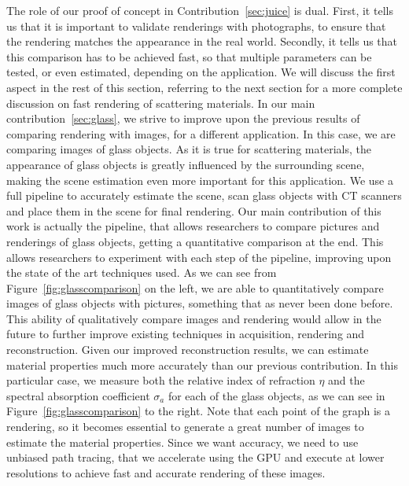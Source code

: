 The role of our proof of concept in Contribution~\ref{sec:juice} is dual. First, it tells us that it is important to validate renderings with photographs, to ensure that the rendering matches the appearance in the real world. Secondly, it tells us that this comparison has to be achieved fast, so that multiple parameters can be tested, or even estimated, depending on the application. We will discuss the first aspect in the rest of this section, referring to the next section for a more complete discussion on fast rendering of scattering materials. In our main contribution~\ref{sec:glass}, we strive to improve upon the previous results of comparing rendering with images, for a different application. In this case, we are comparing images of glass objects. As it is true for scattering materials, the appearance of glass objects is greatly influenced by the surrounding scene, making the scene estimation even more important for this application. We use a full pipeline to accurately estimate the scene, scan glass objects with CT scanners and place them in the scene for final rendering. Our main contribution of this work is actually the pipeline, that allows researchers to compare pictures and renderings of glass objects, getting a quantitative comparison at the end. This allows researchers to experiment with each step of the pipeline, improving upon the state of the art techniques used. As we can see from Figure~\ref{fig:glasscomparison} on the left, we are able to quantitatively compare images of glass objects with pictures, something that as never been done before. This ability of qualitatively compare images and rendering would allow in the future to further improve existing techniques in acquisition, rendering and reconstruction. Given our improved reconstruction results, we can estimate material properties much more accurately than our previous contribution. In this particular case, we measure both the relative index of refraction $\eta$ and the spectral absorption coefficient $\sigma_a$ for each of the glass objects, as we can see in Figure~\ref{fig:glasscomparison} to the right. Note that each point of the graph is a rendering, so it becomes essential to generate a great number of images to estimate the material properties. Since we want accuracy, we need to use unbiased path tracing, that we accelerate using the GPU and execute at lower resolutions to achieve fast and accurate rendering of these images. 

